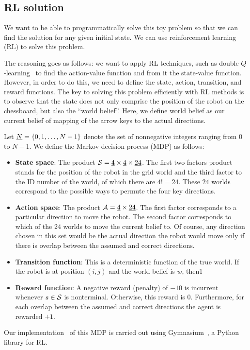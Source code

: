 \subsection{RL solution}
\label{ssec:rl_sol}
%
We want to be able to programmatically solve this toy problem so that we can 
find the solution for any given initial state. We can use reinforcement learning
(RL) to solve this problem. 

The reasoning goes as follows: we want to apply RL techniques, such as double
$Q$-learning~\cite{morales2020grokking} to find the action-value function and
from it the state-value function. However, in order to do this, we need to
define the state, action, transition, and reward functions. The key to solving 
this problem efficiently with RL methods is to observe that the state does not 
only comprise the position of the robot on the chessboard, but also the ``world 
belief''. Here, we define world belief as our current belief of mapping of the 
arrow keys to the actual directions.

Let $\uline{N} = \{0, 1, \ldots, N-1\}$ denote the set of nonnegative integers
ranging from $0$ to $N-1$. We define the Markov decision process (MDP) as
follows:

\begin{itemize}
\item \textbf{State space}: The product $\mc{S} = \uline{4} \times \uline{4}
\times \uline{24}$. The first two factors product stands for the position of the
robot in the grid world and the third factor to the ID number of the world, of
which there are $4! = 24$. These $24$ worlds correspond to the possible ways to
permute the four key directions.
\item \textbf{Action space}: The product $\mc{A} = \uline{4} \times \uline{24}$.
The first factor corresponds to a particular direction to move the robot. The
second factor corresponds to which of the $24$ worlds to move the current belief
to. Of course, any direction chosen in this set would be the actual direction
the robot would move only if there is overlap between the assumed and correct 
directions.
\item \textbf{Transition function}: This is a deterministic function of the true
world. If the robot is at position $(i, j)$ and the world belief is $w$, then1
\item \textbf{Reward function}: A negative reward (penalty) of $-10$ is
incurrent whenever $s \in \mathcal{S}$ is nonterminal. Otherwise, this reward is $0$.
Furthermore, for each overlap between the assumed and correct directions
the agent is rewarded $+1$.
\end{itemize}

Our implementation~\cite{saticiGitHub} of this MDP is carried out using 
Gymnasium~\cite{towers2024gymnasium}, a Python library for RL.
